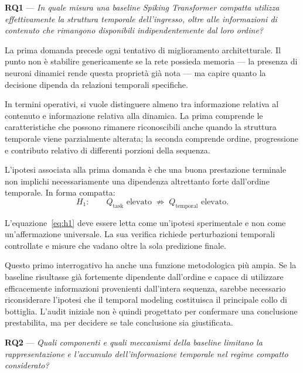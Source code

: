 \vspace{0.8em}
\noindent\textbf{RQ1} --- \emph{In quale misura una baseline Spiking Transformer compatta utilizza effettivamente la struttura temporale dell'ingresso, oltre alle informazioni di contenuto che rimangono disponibili indipendentemente dal loro ordine?}

La prima domanda precede ogni tentativo di miglioramento architetturale. Il punto non è stabilire genericamente se la rete possieda memoria --- la presenza di neuroni dinamici rende questa proprietà già nota --- ma capire quanto la decisione dipenda da relazioni temporali specifiche.

In termini operativi, si vuole distinguere almeno tra informazione relativa al contenuto e informazione relativa alla dinamica. La prima comprende le caratteristiche che possono rimanere riconoscibili anche quando la struttura temporale viene parzialmente alterata; la seconda comprende ordine, progressione e contributo relativo di differenti porzioni della sequenza.

L'ipotesi associata alla prima domanda è che una buona prestazione terminale non implichi necessariamente una dipendenza altrettanto forte dall'ordine temporale. In forma compatta:
\begin{equation}
\label{eq:h1}
H_1: \qquad Q_{\mathrm{task}}\text{ elevato} \;\not\Rightarrow\; Q_{\mathrm{temporal}}\text{ elevato}.
\end{equation}

L'equazione~\eqref{eq:h1} deve essere letta come un'ipotesi sperimentale e non come un'affermazione universale. La sua verifica richiede perturbazioni temporali controllate e misure che vadano oltre la sola predizione finale.

Questo primo interrogativo ha anche una funzione metodologica più ampia. Se la baseline risultasse già fortemente dipendente dall'ordine e capace di utilizzare efficacemente informazioni provenienti dall'intera sequenza, sarebbe necessario riconsiderare l'ipotesi che il temporal modeling costituisca il principale collo di bottiglia. L'audit iniziale non è quindi progettato per confermare una conclusione prestabilita, ma per decidere se tale conclusione sia giustificata.

\vspace{0.8em}
\noindent\textbf{RQ2} --- \emph{Quali componenti e quali meccanismi della baseline limitano la rappresentazione e l'accumulo dell'informazione temporale nel regime compatto considerato?}

